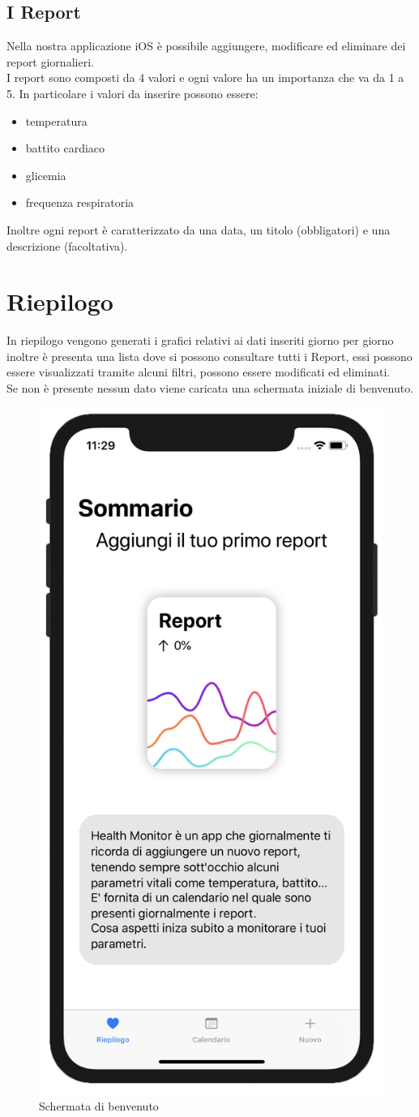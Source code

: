\documentclass{article}
\begin{document}
\medskip

\subsection{I Report}

Nella nostra applicazione iOS è possibile aggiungere, modificare ed eliminare dei report giornalieri. \\
I report sono composti da 4 valori e ogni valore ha un importanza che va da 1 a 5. In particolare i valori da inserire possono essere: 
\begin{itemize}
  \item temperatura
  \item battito cardiaco
  \item glicemia
  \item frequenza respiratoria
\end{itemize}

Inoltre ogni report è caratterizzato da una data, un titolo (obbligatori) e una descrizione (facoltativa). 


\newpage
\section{Riepilogo}

In riepilogo vengono generati i grafici relativi ai dati inseriti giorno per giorno inoltre è presenta una lista dove si possono consultare tutti i Report, essi  possono essere visualizzati tramite alcuni filtri, possono essere modificati ed eliminati.\\
Se non è presente nessun dato viene caricata una schermata iniziale di benvenuto. 

\begin{figure}[htp]

\centering
\includegraphics[width=.15\textwidth]{img/riepilogo_iniziale.png}

\caption{Schermata di benvenuto}
\label{fig:figure2}
\end{figure}
\end{document}
